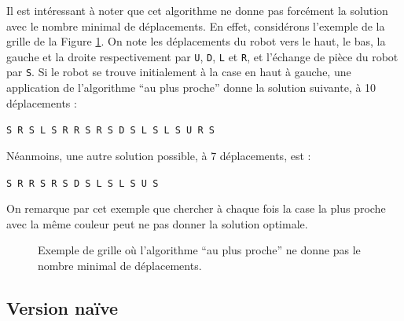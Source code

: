 \documentclass[a4paper,12pt]{article}
\numberwithin{equation}{section}
\begin{document}
Il est intéressant à noter que cet algorithme ne donne pas forcément la solution avec le nombre minimal de déplacements. En effet, considérons l'exemple de la grille de la Figure \ref{FigExpl}. On note les déplacements du robot vers le haut, le bas, la gauche et la droite respectivement par \texttt{U}, \texttt{D}, \texttt{L} et \texttt{R}, et l'échange de pièce du robot par \texttt{S}. Si le robot se trouve initialement à la case en haut à gauche, une application de l'algorithme ``au plus proche'' donne la solution suivante, à 10 déplacements :

\texttt{S R S L S R R S R S D S L S L S U R S}

Néanmoins, une autre solution possible, à 7 déplacements, est :

\texttt{S R R S R S D S L S L S U S}

On remarque par cet exemple que chercher à chaque fois la case la plus proche avec la même couleur peut ne pas donner la solution optimale.

\begin{figure}[ht]
\centering
{}
\caption{Exemple de grille où l'algorithme ``au plus proche'' ne donne pas le nombre minimal de déplacements.}
\label{FigExpl}
\end{figure}

\subsection{Version naïve}
\label{SecNaive}
\end{document}
